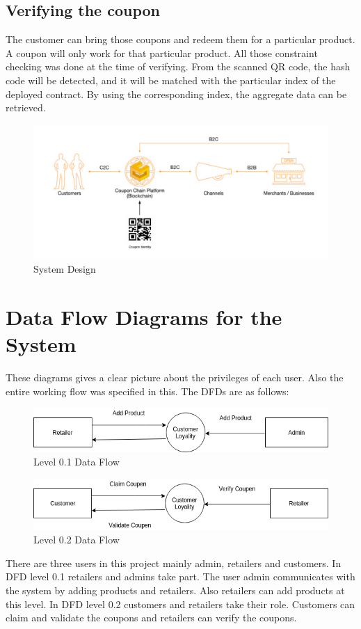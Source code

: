 \subsection{Verifying the coupon}
The customer can bring those coupons and redeem them for a particular product. A coupon will only work for that particular product. All those constraint checking was done at the time of verifying. From the scanned QR code, the hash code will be detected, and it will be matched with the particular index of the deployed contract. By using the corresponding index, the aggregate data can be retrieved.
\begin{figure}[H]
\includegraphics[scale=0.6]{flow}
\caption{System Design}
\end{figure}

\section{Data Flow Diagrams for the System}
\par
These diagrams gives a clear picture about the privileges of each user. Also the entire working flow was specified in this. The DFDs are as follows:
\begin{figure}[H]
\includegraphics[scale=0.7]{level0_1}
\caption{Level 0.1 Data Flow}
\end{figure}


\begin{figure}[H]
\includegraphics[scale=0.7]{level0_2}
\caption{Level 0.2 Data Flow}
\end{figure}
\par
There are three users in this project mainly admin, retailers and customers. In DFD level 0.1 retailers and admins take part. The user admin communicates with the system by adding products and retailers. Also retailers can add products at this level. In DFD level 0.2 customers and retailers take their role. Customers can claim and validate the coupons and retailers can verify the coupons.

